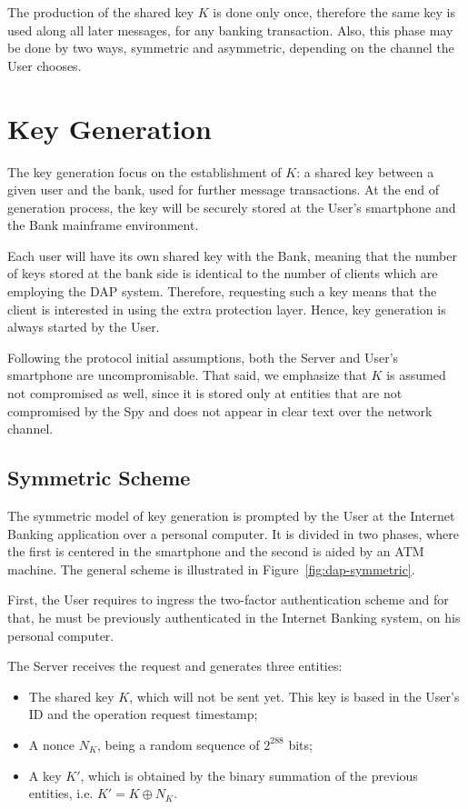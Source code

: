 The production of the shared key $K$ is done only once, therefore the same key is used along all later messages, for any banking transaction. Also, this phase may be done by two ways, symmetric and asymmetric, depending on the channel the User chooses.





\section{Key Generation}
The key generation focus on the establishment of $K$: a shared key between a given user and the bank, used for further message transactions. At the end of generation process, the key will be securely stored at the User's smartphone and the Bank mainframe environment.

Each user will have its own shared key with the Bank, meaning that the number of keys stored at the bank side is identical to the number of clients which are employing the DAP system. Therefore, requesting such a key means that the client is interested in using the extra protection layer. Hence, key generation is always started by the User.

Following the protocol initial assumptions, both the Server and User's smartphone are uncompromisable. That said, we emphasize that $K$ is assumed not compromised as well, since it is stored only at entities that are not compromised by the Spy and does not appear in clear text over the network channel.



\subsection{Symmetric Scheme}
The symmetric model of key generation is prompted by the User at the Internet Banking application over a personal computer. It is divided in two phases, where the first is centered in the smartphone and the second is aided by an ATM machine. The general scheme is illustrated in Figure~\ref{fig:dap-symmetric}.

First, the User requires to ingress the two-factor authentication scheme and for that, he must be previously authenticated in the Internet Banking system, on his personal computer.

The Server receives the request and generates three entities:

\begin{itemize}
  \item The shared key $K$, which will not be sent yet. This key is based in the User's ID and the operation request timestamp;

  \item A nonce $N_K$, being a random sequence of $2^{288}$ bits;

  \item A key $K'$, which is obtained by the binary summation of the previous entities, i.e. $K' = K \oplus N_K$.
\end{itemize}

